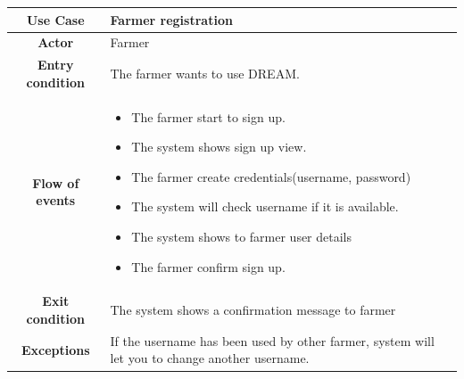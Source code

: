 \documentclass[../../main.tex]{subfiles}
\begin{document}
      \begin{table}[H]
        \centering
          \begin{tabular}{c m{}}
          \hline
          \textbf{Use Case} & Farmer registration\\ \hline
          \textbf{Actor} & Farmer\\ \hline
          \textbf{Entry condition} & The farmer wants to use DREAM.\\  \hline
          \textbf{Flow of events} & \begin{itemize}
                                     \item The farmer start to sign up.
                                      \item The system shows sign up view.
                                      \item The farmer create credentials(username, password)
                                      \item The system will check username if it is available.
                                      \item The system shows to farmer user details
                                      \item The farmer confirm sign up.
                                    \end{itemize}\\ \hline
          \textbf{Exit condition} & The system shows a confirmation message to farmer \\ \hline
          \textbf{Exceptions} & If the username has been used by other farmer, system will let you to change another username. \\ \hline
          \end{tabular}
      \end{table}
\end{document}
